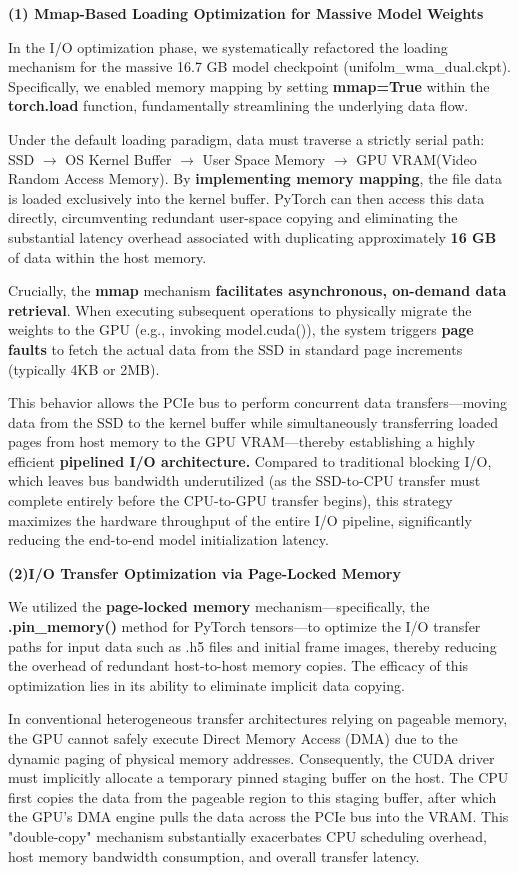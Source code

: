 \textbf{(1) Mmap-Based Loading Optimization for Massive Model Weights}

In the I/O optimization phase, we systematically refactored the loading mechanism for the massive 16.7 GB model checkpoint (unifolm\_wma\_dual.ckpt). 
Specifically, we enabled memory mapping by setting \textbf{mmap=True} within the \textbf{torch.load} function, fundamentally streamlining the underlying data flow.

Under the default loading paradigm, data must traverse a strictly serial path: SSD $\rightarrow$ OS Kernel Buffer $\rightarrow$ User Space Memory $\rightarrow$ GPU VRAM(Video Random Access Memory). 
By \textbf{implementing memory mapping}, the file data is loaded exclusively into the kernel buffer. 
PyTorch can then access this data directly, circumventing redundant user-space copying and eliminating the substantial latency overhead associated with duplicating approximately \textbf{16 GB} of data within the host memory.

Crucially, the \textbf{mmap} mechanism \textbf{facilitates asynchronous, on-demand data retrieval}.
When executing subsequent operations to physically migrate the weights to the GPU (e.g., invoking model.cuda()), the system triggers \textbf{page faults} to fetch the actual data from the SSD in standard page increments (typically 4KB or 2MB).

This behavior allows the PCIe bus to perform concurrent data transfers—moving data from the SSD to the kernel buffer while simultaneously transferring loaded pages from host memory to the GPU VRAM—thereby establishing a highly efficient\textbf{ pipelined I/O architecture.}
Compared to traditional blocking I/O, which leaves bus bandwidth underutilized (as the SSD-to-CPU transfer must complete entirely before the CPU-to-GPU transfer begins), this strategy maximizes the hardware throughput of the entire I/O pipeline, significantly reducing the end-to-end model initialization latency.
    
\textbf{(2)I/O Transfer Optimization via Page-Locked Memory} 

We utilized the \textbf{page-locked memory} mechanism—specifically, the \textbf{.pin\_memory()} method for PyTorch tensors—to optimize the I/O transfer paths for input data such as .h5 files and initial frame images, thereby reducing the overhead of redundant host-to-host memory copies. The efficacy of this optimization lies in its ability to eliminate implicit data copying.

In conventional heterogeneous transfer architectures relying on pageable memory, the GPU cannot safely execute Direct Memory Access (DMA) due to the dynamic paging of physical memory addresses. 
Consequently, the CUDA driver must implicitly allocate a temporary pinned staging buffer on the host. 
The CPU first copies the data from the pageable region to this staging buffer, after which the GPU's DMA engine pulls the data across the PCIe bus into the VRAM. 
This "double-copy" mechanism substantially exacerbates CPU scheduling overhead, host memory bandwidth consumption, and overall transfer latency.

